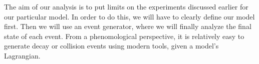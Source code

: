 \label{chapter:analysis}

The aim of our analysis is to put limits on the experiments discussed earlier for our particular model.
In order to do this, we will have to clearly define our model first.
Then we will use an event generator, where we will finally analyze the final state of each event.
From a phenomological perspective, it is relatively easy to generate decay or collision events using modern tools, given a model's Lagrangian. 




